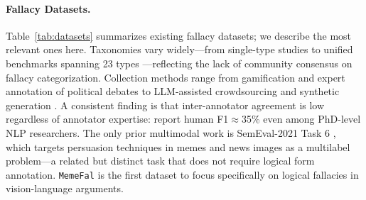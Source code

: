 \documentclass[11pt]{article}
\newcommand{\corpus}{{\tt MemeFal}}
\begin{document}
\paragraph{Fallacy Datasets.}
Table~\ref{tab:datasets} summarizes existing fallacy datasets; we describe the most relevant ones here.
Taxonomies vary widely---from single-type studies \citep{habernal_before_2018} to unified benchmarks spanning 23 types \citep{helwe_mafalda_2024}---reflecting the lack of community consensus on fallacy categorization.
Collection methods range from gamification \citep{habernal_argotario_2017} and expert annotation of political debates \citep{goffredo_argument-based_2023} to LLM-assisted crowdsourcing \citep{yeh_cocolofa_2024} and synthetic generation \citep{li_reason_2024}.
A consistent finding is that inter-annotator agreement is low regardless of annotator expertise: \citet{helwe_mafalda_2024} report human F1$\approx$35\% even among PhD-level NLP researchers.
The only prior multimodal work is SemEval-2021 Task 6 \citep{dimitrov_semeval-2021_2021}, which targets persuasion techniques in memes and news images as a multilabel problem---a related but distinct task that does not require logical form annotation.
\corpus{} is the first dataset to focus specifically on logical fallacies in vision-language arguments.
\end{document}
